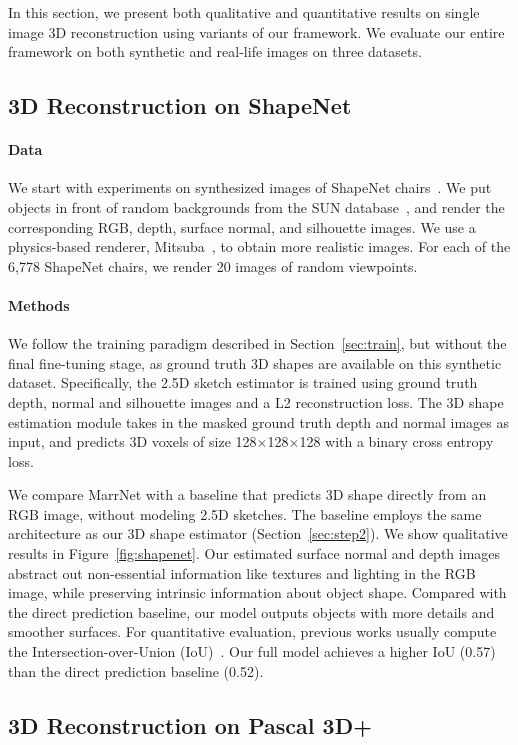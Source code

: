 \documentclass{article}
\newcommand{\sect}[1]{Section~\ref{#1}}
\newcommand{\fig}[1]{Figure~\ref{#1}}
\newcommand{\myparagraph}[1]{\vspace{-3pt}\paragraph{#1}}
\begin{document}
In this section, we present both qualitative and quantitative results on single image 3D reconstruction using variants of our framework. We evaluate our entire framework on both synthetic and real-life images on three datasets. 

\subsection{3D Reconstruction on ShapeNet}
\label{sec:shapenet}

\paragraph{Data} 
We start with experiments on synthesized images of ShapeNet chairs~\citep{Chang2015}. We put objects in front of random backgrounds from the SUN database~\citep{Xiao2010}, and render the corresponding RGB, depth, surface normal, and silhouette images. We use a physics-based renderer, Mitsuba~\citep{Mitsuba}, to obtain more realistic images. For each of the 6,778 ShapeNet chairs, we render 20 images of random viewpoints.

\myparagraph{Methods}
We follow the training paradigm described in \sect{sec:train}, but without the final fine-tuning stage, as ground truth 3D shapes are available on this synthetic dataset. Specifically, the 2.5D sketch estimator is trained using ground truth depth, normal and silhouette images and a L2 reconstruction loss. The 3D shape estimation module takes in the masked ground truth depth and normal images as input, and predicts 3D voxels of size 128$\times$128$\times$128 with a binary cross entropy loss. 

We compare MarrNet with a baseline that predicts 3D shape directly from an RGB image, without modeling 2.5D sketches. The baseline employs the same architecture as our 3D shape estimator (\sect{sec:step2}). We show qualitative results in \fig{fig:shapenet}. Our estimated surface normal and depth images abstract out non-essential information like textures and lighting in the RGB image, while preserving intrinsic information about object shape. Compared with the direct prediction baseline, our model outputs objects with more details and smoother surfaces. For quantitative evaluation, previous works usually compute the Intersection-over-Union (IoU)~\citep{tulsiani2017multi,Choy2016}. Our full model achieves a higher IoU (0.57) than the direct prediction baseline (0.52).

\subsection{3D Reconstruction on Pascal 3D+}
\label{sec:pascal}
\end{document}
